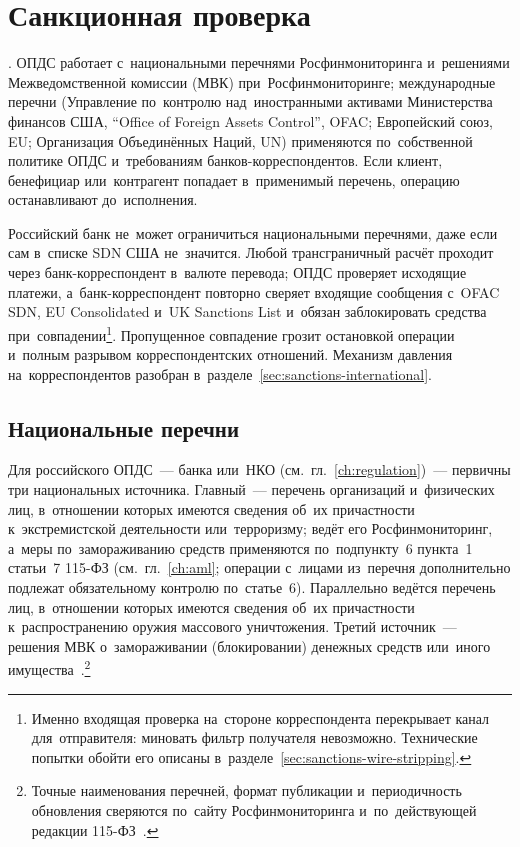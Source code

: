 
\chapter{Санкционная проверка}\label{ch:sanctions}

. ОПДС работает с~национальными перечнями
Росфинмониторинга и~решениями Межведомственной комиссии (МВК)
при~Росфинмониторинге; международные перечни (Управление по~контролю
  над~иностранными активами Министерства финансов США, \enquote{Office of Foreign
Assets Control}, OFAC; Европейский союз, EU; Организация Объединённых Наций, UN)
применяются по~собственной политике ОПДС и~требованиям банков-корреспондентов.
Если клиент, бенефициар или~контрагент попадает в~применимый перечень, операцию
останавливают до~исполнения.

Российский банк не~может ограничиться национальными перечнями, даже если
сам в~списке SDN США не~значится. Любой трансграничный расчёт проходит через
банк-корреспондент в~валюте перевода; ОПДС проверяет исходящие платежи,
а~банк-корреспондент повторно сверяет входящие сообщения с~OFAC SDN, EU
Consolidated и~UK Sanctions List и~обязан заблокировать средства
при~совпадении\footnote{Именно входящая проверка на~стороне корреспондента
  перекрывает канал для~отправителя: миновать фильтр получателя невозможно.
Технические попытки обойти его описаны в~разделе~\ref{sec:sanctions-wire-stripping}.}.
Пропущенное совпадение грозит остановкой операции и~полным разрывом корреспондентских
отношений. Механизм давления на~корреспондентов разобран
в~разделе~\ref{sec:sanctions-international}.

\section{Национальные перечни}\label{sec:sanctions-rf-lists}

Для российского ОПДС~--- банка или~НКО (см.~гл.~\ref{ch:regulation})~--- первичны
три национальных источника. Главный~--- перечень организаций и~физических лиц,
в~отношении которых имеются сведения об~их причастности к~экстремистской
деятельности или~терроризму; ведёт его Росфинмониторинг, а~меры по~замораживанию
средств применяются по~подпункту~6 пункта~1 статьи~7 115-ФЗ (см.~гл.~\ref{ch:aml};
  операции с~лицами из~перечня дополнительно подлежат обязательному контролю
по~статье~6). Параллельно ведётся перечень лиц, в~отношении которых имеются
сведения об~их причастности к~распространению оружия массового уничтожения.
Третий источник~--- решения МВК о~замораживании (блокировании) денежных средств
или~иного имущества~\cite{fz-115}.\footnote{Точные
  наименования перечней, формат публикации и~периодичность обновления сверяются
по~сайту Росфинмониторинга и~по~действующей редакции 115-ФЗ~\cite{rosfinmonitoring-lists,fedsfm-mvk}.}

